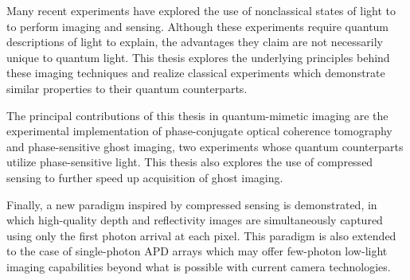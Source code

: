 Many recent experiments have explored the use of nonclassical states
of light to to perform imaging and sensing. Although these experiments
require quantum descriptions of light to explain, the advantages they
claim are not necessarily unique to quantum light. This thesis
explores the underlying principles behind these imaging techniques and
realize classical experiments which demonstrate similar properties to
their quantum counterparts.

The principal contributions of this thesis in quantum-mimetic imaging
are the experimental implementation of phase-conjugate optical
coherence tomography and phase-sensitive ghost imaging, two
experiments whose quantum counterparts utilize phase-sensitive light.
This thesis also explores the use of compressed sensing to further
speed up acquisition of ghost imaging.

Finally, a new paradigm inspired by compressed sensing is
demonstrated, in which high-quality depth and reflectivity images are
simultaneously captured using only the first photon arrival at each
pixel. This paradigm is also extended to the case of single-photon APD
arrays which may offer few-photon low-light imaging capabilities
beyond what is possible with current camera technologies.
